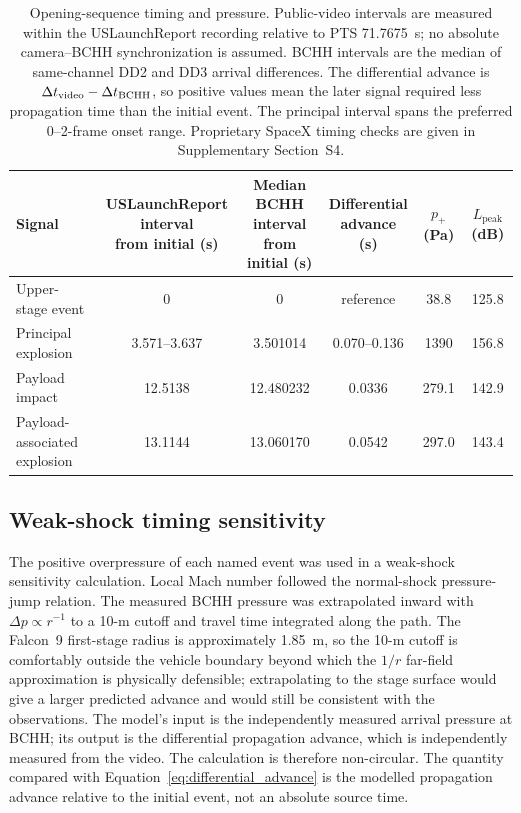 \documentclass[]{seismica}
\begin{document}
\begin{table}[!tbp]
\caption{Opening-sequence timing and pressure. Public-video intervals are
measured within the USLaunchReport recording relative to PTS 71.7675~s; no
absolute camera--BCHH synchronization is assumed. BCHH intervals are the
median of same-channel DD2 and DD3 arrival differences. The differential
advance is $\Delta t_{\rm video}-\Delta t_{\rm BCHH}$, so positive values mean
the later signal required less propagation time than the initial event. The
principal interval spans the preferred 0--2-frame onset range. Proprietary
SpaceX timing checks are given in Supplementary Section~S4.}
\label{tab:principal_events}
\centering
\small
\begin{tabularx}{\textwidth}{Xccccc}
\hline
Signal &
\shortstack{USLaunchReport interval\\from initial (s)} &
\shortstack{Median BCHH interval\\from initial (s)} &
\shortstack{Differential\\advance (s)} &
$p_+$ (Pa) &
\shortstack{$L_{\mathrm{peak}}$\\(dB)} \\
\hline
Upper-stage event & 0 & 0 & reference & 38.8 & 125.8 \\
Principal explosion & 3.571--3.637 & 3.501014 & 0.070--0.136 & 1390 & 156.8 \\
Payload impact & 12.5138 & 12.480232 & 0.0336 & 279.1 & 142.9 \\
Payload-associated explosion & 13.1144 & 13.060170 & 0.0542 & 297.0 & 143.4 \\
\hline
\end{tabularx}
\end{table}

\subsection{Weak-shock timing sensitivity}

The positive overpressure of each named event was used in a weak-shock
sensitivity calculation. Local Mach number followed the normal-shock
pressure-jump relation. The measured BCHH pressure was extrapolated inward with
$\Delta p\propto r^{-1}$ to a 10-m cutoff and travel time integrated along
the path. The Falcon~9 first-stage radius is approximately 1.85~m, so the
10-m cutoff is comfortably outside the vehicle boundary beyond which the $1/r$
far-field approximation is physically defensible; extrapolating to the stage
surface would give a larger predicted advance and would still be consistent
with the observations. The model's input is the independently measured arrival
pressure at BCHH; its output is the differential propagation advance, which is
independently measured from the video. The calculation is therefore
non-circular. The quantity compared with
Equation~\ref{eq:differential_advance} is the modelled propagation advance
relative to the initial event, not an absolute source time.
\end{document}
